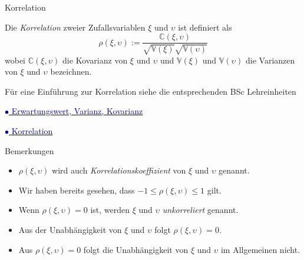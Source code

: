 \documentclass[
  8pt,
  ignorenonframetext,
]{beamer}
\providecommand{\tightlist}{%
  \setlength{\itemsep}{0pt}\setlength{\parskip}{0pt}}
\newcommand{\ups}{\upsilon}
\begin{document}
\begin{frame}{Korrelation}
\protect\hypertarget{korrelation-2}{}
\small
\begin{definition}[Korrelation]
\justifying
Die \textit{Korrelation} zweier Zufallsvariablen $\xi$ und $\ups$ ist definiert als
\begin{equation}
\rho(\xi,\ups) := \frac{\mathbb{C}(\xi,\ups)}{\sqrt{\mathbb{V}(\xi)}\sqrt{\mathbb{V}(\ups)}}
\end{equation}
wobei $\mathbb{C}(\xi,\ups)$ die Kovarianz von $\xi$ und $\ups$ und $\mathbb{V}(\xi)$ und
$\mathbb{V}(\ups)$ die Varianzen von $\xi$ und $\ups$ bezeichnen.
\end{definition}

\small

Für eine Einführung zur Korrelation siehe die entsprechenden BSc
Lehreinheiten

\href{https://youtu.be/613-3a1Pyyg}{\textcolor{darkblue}{$\bullet$ Erwartungswert, Varianz, Kovarianz}}

\href{https://youtu.be/zfI6LoX8bc4}{\textcolor{darkblue}{$\bullet$ Korrelation}}

\footnotesize

Bemerkungen

\begin{itemize}
\tightlist
\item
  \(\rho(\xi,\ups)\) wird auch \textit{Korrelationskoeffizient} von
  \(\xi\) und \(\ups\) genannt.
\item
  Wir haben bereits gesehen, dass \(-1 \le \rho(\xi,\ups) \le 1\) gilt.
\item
  Wenn \(\rho(\xi,\ups) = 0\) ist, werden \(\xi\) und \(\ups\)
  \textit{unkorreliert} genannt.
\item
  Aus der Unabhängigkeit von \(\xi\) und \(\ups\) folgt
  \(\rho(\xi,\ups) = 0\).
\item
  Aus \(\rho(\xi,\ups) = 0\) folgt die Unabhängigkeit von \(\xi\) und
  \(\ups\) im Allgemeinen nicht.
\end{itemize}
\end{frame}
\end{document}
